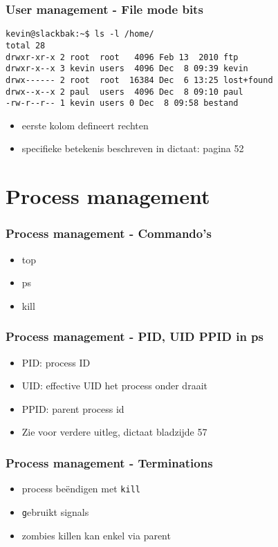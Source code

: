 \documentclass{beamer}
\begin{document}
\begin{frame}[fragile]
  \frametitle{User management - File mode bits}
  \begin{lstlisting}
kevin@slackbak:~$ ls -l /home/                                                                                                                                    
total 28                                                                                                                                                              
drwxr-xr-x 2 root  root   4096 Feb 13  2010 ftp                                                                                                                       
drwxr-x--x 3 kevin users  4096 Dec  8 09:39 kevin                                                                                                                     
drwx------ 2 root  root  16384 Dec  6 13:25 lost+found                                                                                                                
drwx--x--x 2 paul  users  4096 Dec  8 09:10 paul                                                                                                                      
-rw-r--r-- 1 kevin users 0 Dec  8 09:58 bestand        
\end{lstlisting}%
\begin{itemize}
  \item<2-> eerste kolom defineert rechten
  \item<3-> specifieke betekenis beschreven in dictaat: pagina 52
\end{itemize}
\end{frame}

\section{Process management}
\begin{frame}
  \frametitle{Process management - Commando's}
  \begin{itemize}
    \item<1-> top
    \item<2-> ps
    \item<3-> kill
  \end{itemize}
\end{frame}

\begin{frame}
  \frametitle{Process management - PID, UID PPID in ps}
  \begin{itemize}
    \item<1-> PID: process ID
    \item<2-> UID: effective UID het process onder draait
    \item<3-> PPID: parent process id
    \item<4-> Zie voor verdere uitleg, dictaat bladzijde 57
  \end{itemize}
\end{frame}

\begin{frame}
  \frametitle{Process management - Terminations}
  \begin{itemize}
    \item<1-> process be\"{e}ndigen met \texttt{kill}
    \item<2-> \texttt gebruikt signals
    \item<3-> zombies killen kan enkel via parent
  \end{itemize}
\end{frame}
\end{document}
